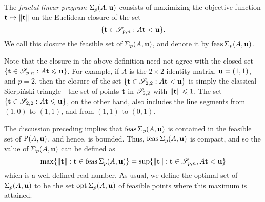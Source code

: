 \documentclass{amsart}
\begin{document}
\begin{definition}
\label{fractal program: D}
The \emph{fractal linear program} $\Sigma_p(A,\mathbf{u})$ consists of maximizing the objective function $\mathbf{t}\mapsto \| \mathbf{t} \|$ on the Euclidean closure of the set \[ \{ \mathbf{t} \in \mathscr{S}_{p,n} : A \mathbf{t} < \mathbf{u} \}.\]  We call this closure the feasible set of $\Sigma_p(A, \mathbf{u})$, and denote it by $\operatorname{feas} \Sigma_p(A, \mathbf{u})$.
\end{definition}

\begin{remark}
Note that the closure in the above definition need not agree with the closed set $\{ \mathbf{t} \in \mathscr{S}_{p,n} : A \mathbf{t} \leqslant \mathbf{u} \}$.
For example, if $A$ is the $2\times 2$ identity matrix, $\mathbf{u} = (1,1)$, and $p=2$, then the closure of the set $\{ \mathbf{t} \in \mathscr{S}_{2,2} : A \mathbf{t} < \mathbf{u} \}$ is simply the classical Sierpi\'nski triangle---the set of points $\mathbf{t}$ in $\mathscr{S}_{2,2}$ with $\| \mathbf{t} \| \leqslant 1$.
The set $\{ \mathbf{t} \in \mathscr{S}_{2,2} : A \mathbf{t} \leqslant \mathbf{u} \}$, on the other hand, also includes the line segments from $(1,0)$ to $(1,1)$, and from $(1,1)$ to $(0,1)$.
\end{remark}

The discussion preceding  implies that $\operatorname{feas} \Sigma_p(A, \mathbf{u})$ is contained in the feasible set of $\mathrm{P}(A, \mathbf{u})$, and hence, is bounded.
Thus, $\operatorname{feas} \Sigma_p(A, \mathbf{u})$ is compact, and so the value of $\Sigma_p(A, \mathbf{u})$ can be defined as
\[
   \max \{ \| \mathbf{t} \|: \mathbf{t} \in \operatorname{feas} \Sigma_p(A, \mathbf{u}) \} = \sup \{ \| \mathbf{t} \| : \mathbf{t} \in \mathscr{S}_{p,n}, A \mathbf{t} < \mathbf{u} \}
\]
which is a well-defined real number.
As usual, we define the optimal set of $\Sigma_p(A, \mathbf{u})$ to be the set $\operatorname{opt} \Sigma_p(A, \mathbf{u})$ of feasible points where this maximum is attained.
\end{document}
